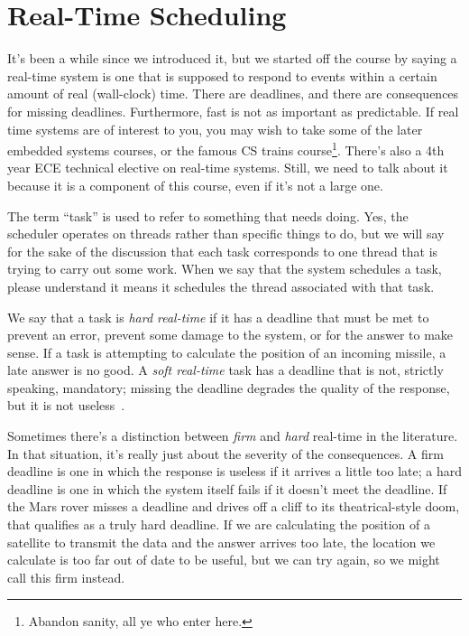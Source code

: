 




\section*{Real-Time Scheduling}
It's been a while since we introduced it, but we started off the course by saying a real-time system is one that is supposed to respond to events within a certain amount of real (wall-clock) time. There are deadlines, and there are consequences for missing deadlines. Furthermore, fast is not as important as predictable. If real time systems are of interest to you, you may wish to take some of the later embedded systems courses, or the famous CS trains course\footnote{Abandon sanity, all ye who enter here.}. There's also a 4th year ECE technical elective on real-time systems. Still, we need to talk about it because it is a component of this course, even if it's not a large one.

The term ``task'' is used to refer to something that needs doing. Yes, the scheduler operates on threads rather than specific things to do, but we will say for the sake of the discussion that each task corresponds to one thread that is trying to carry out some work. When we say that the system schedules a task, please understand it means it schedules the thread associated with that task.

We say that a task is \textit{hard real-time} if it has a deadline that must be met to prevent an error, prevent some damage to the system, or for the answer to make sense. If a task is attempting to calculate the position of an incoming missile, a late answer is no good. A \textit{soft real-time} task has a deadline that is not, strictly speaking, mandatory; missing the deadline degrades the quality of the response, but it is not useless~\cite{osi}.

Sometimes there's a distinction between \textit{firm} and \textit{hard} real-time in the literature. In that situation, it's really just about the severity of the consequences. A firm deadline is one in which the response is useless if it arrives a little too late; a hard deadline is one in which the system itself fails if it doesn't meet the deadline. If the Mars rover misses a deadline and drives off a cliff to its theatrical-style doom, that qualifies as a truly hard deadline. If we are calculating the position of a satellite to transmit the data and the answer arrives too late, the location we calculate is too far out of date to be useful, but we can try again, so we might call this firm instead.

